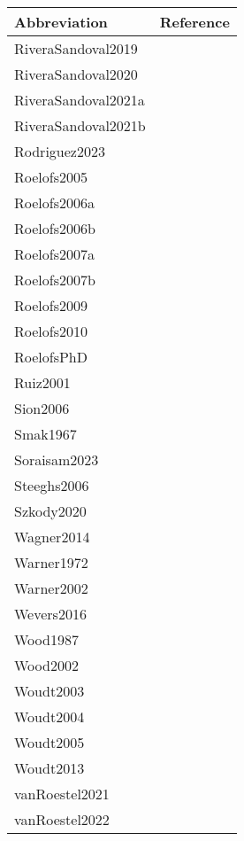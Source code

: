 \documentclass[fleqn,usenatbib]{mnras}
\begin{document}
\begin{table}
\begin{tabular}{lc}
Abbreviation & Reference\\
\hline
RiveraSandoval2019 & \citet{RiveraSandoval2019}\\
RiveraSandoval2020 & \citet{RiveraSandoval2020}\\
RiveraSandoval2021a & \citet{RiveraSandoval2021a}\\
RiveraSandoval2021b & \citet{RiveraSandoval2021b}\\
Rodriguez2023 & \citet{Rodriguez2023}\\
Roelofs2005 & \citet{Roelofs2005}\\
Roelofs2006a & \citet{Roelofs2006a}\\
Roelofs2006b & \citet{Roelofs2006b}\\
Roelofs2007a & \citet{Roelofs2007a}\\
Roelofs2007b & \citet{Roelofs2007b}\\
Roelofs2009 & \citet{Roelofs2009}\\
Roelofs2010 & \citet{Roelofs2010}\\
RoelofsPhD & \citet{RoelofsPhD}\\
Ruiz2001 & \citet{Ruiz2001}\\
Sion2006 & \citet{Sion2006}\\
Smak1967 & \citet{Smak1967}\\
Soraisam2023 & \citet{Soraisam2023}\\
Steeghs2006 & \citet{Steeghs2006}\\
Szkody2020 & \citet{Szkody2020}\\
Wagner2014 & \citet{Wagner2014}\\
Warner1972 & \citet{Warner1972}\\
Warner2002 & \citet{Warner2002}\\
Wevers2016 & \citet{Wevers2016}\\
Wood1987 & \citet{Wood1987}\\
Wood2002 & \citet{Wood2002}\\
Woudt2003 & \citet{Woudt2003}\\
Woudt2004 & \citet{Woudt2004}\\
Woudt2005 & \citet{Woudt2005}\\
Woudt2013 & \citet{Woudt2013}\\
vanRoestel2021 & \citet{vanRoestel2021}\\
vanRoestel2022 & \citet{vanRoestel2022}\\
\hline
\end{tabular}
\end{table}
\end{document}
